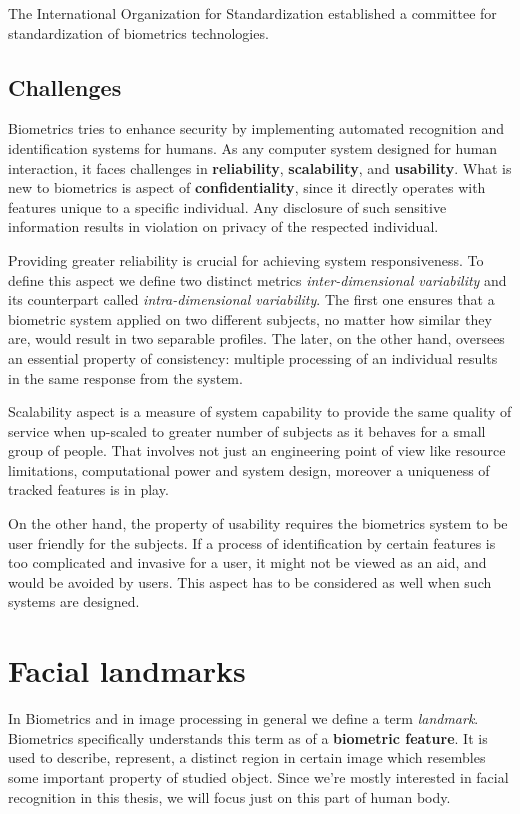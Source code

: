 The International Organization for Standardization established a committee for standardization of biometrics technologies.

\subsection{Challenges}

Biometrics tries to enhance security by implementing automated recognition and identification systems for humans. As any computer system designed for human interaction, it faces challenges in \textbf{reliability}, \textbf{scalability}, and \textbf{usability}. What is new to biometrics is aspect of \textbf{confidentiality}, since it directly operates with features unique to a specific individual. Any disclosure of such sensitive information results in violation on privacy of the respected individual.

Providing greater reliability is crucial for achieving system responsiveness. To define this aspect we define two distinct metrics \textit{inter-dimensional variability} and its counterpart called \textit{intra-dimensional variability}. The first one ensures that a biometric system applied on two different subjects, no matter how similar they are, would result in two separable profiles. The later, on the other hand, oversees an essential property of consistency: multiple processing of an individual results in the same response from the system.

Scalability aspect is a measure of system capability to provide the same quality of service when up-scaled to greater number of subjects as it behaves for a small group of people. That involves not just an engineering point of view like resource limitations, computational power and system design, moreover a uniqueness of tracked features is in play.

On the other hand, the property of usability requires the biometrics system to be user friendly for the subjects. If a process of identification by certain features is too complicated and invasive for a user, it might not be viewed as an aid, and would be avoided by users. This aspect has to be considered as well when such systems are designed.

\section{Facial landmarks}

In Biometrics and in image processing in general we define a term \textit{landmark}. Biometrics specifically understands this term as of a \textbf{biometric feature}. It is used to describe, represent, a distinct region in certain image which resembles some important property of studied object. Since we're mostly interested in facial recognition in this thesis, we will focus just on this part of human body.

